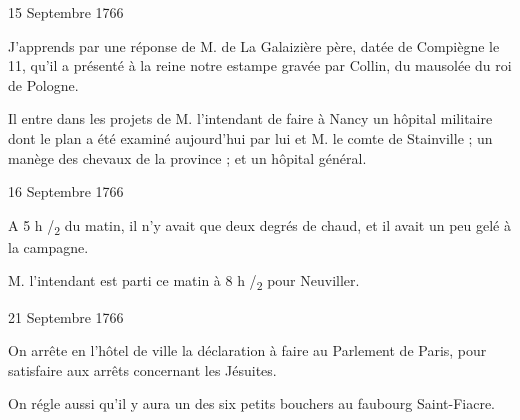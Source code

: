                      \begin{diary}{15 Septembre 1766}{}

                         J’apprends par une réponse de M. de La Galaizière
                              père, datée de Compiègne
                           le 11, qu’il
                           a présenté à la
                              reine notre estampe
                           gravée par Collin, du mausolée du
                              roi
                              de Pologne. \bigskip


                         Il entre dans les projets de M. l’intendant
                           de faire à Nancy un hôpital
                           militaire
                           dont le plan a été examiné aujourd'hui
                           par lui et M. le comte de
                              Stainville ; un
                           manège des chevaux de la province ; et
                           un hôpital général. \bigskip


                     \end{diary}



                     \begin{diary}{16 Septembre 1766}{}

                         A 5 h /\textsubscript{2} du matin, il n’y avait que deux
                              degrés de chaud, et il avait un peu gelé
                           à la campagne. \bigskip



                           M. l’intendant est parti ce matin à 8 h /\textsubscript{2}
                           pour Neuviller. \bigskip


                     \end{diary}

                     \begin{diary}{21 Septembre 1766}{}

                         On arrête en l’hôtel de ville la déclaration à
                           faire au Parlement de
                           Paris, pour satisfaire
                           aux arrêts concernant les
                              Jésuites. \bigskip


                         On régle aussi qu’il y aura un des six
                           petits
                           bouchers au faubourg
                              Saint-Fiacre.
                        \bigskip


                     \end{diary}

